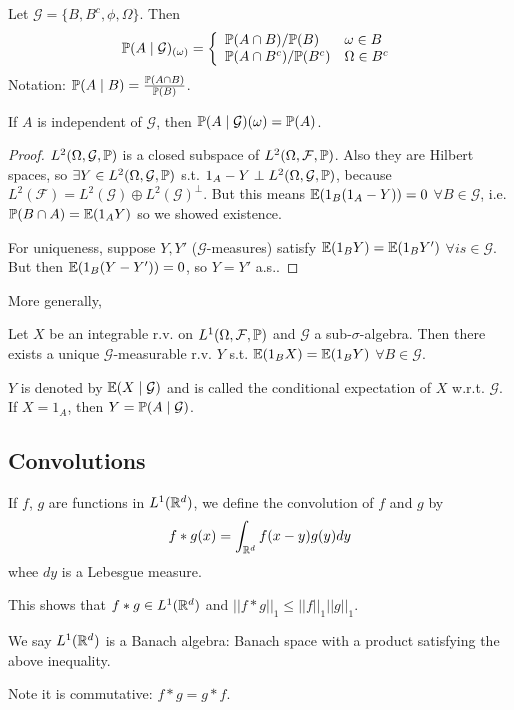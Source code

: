 \documentclass[a4paper]{article}
\begin{document}
\begin{eg}
Let $\mathcal{G} = \{B,B^c,\phi,\Omega\}$. Then
\begin{equation*}
\begin{aligned}
\P(A \mid \mathcal{G})_{(\omega)} = \left\{
\begin{array}{ll}
\P(A \cap B) / \P(B) & \omega \in B\\
\P(A \cap B^c) / \P(B^c) & \Omega \in B^c
\end{array}
\right.
\end{aligned}
\end{equation*}
Notation: $\P(A \mid B) = \frac{\P(A \cap B)}{\P(B)}$.

If $A$ is independent of $\mathcal{G}$, then $\P(A \mid \mathcal{G})(\omega) = \P(A)$.
\begin{proof}
$L^2(\Omega,\mathcal{G},\P)$ is a closed subspace of $L^2(\Omega,\mathcal{F},\P)$. Also they are Hilbert spaces, so $\exists Y \in L^2 (\Omega,\mathcal{G},\P)$ s.t. $1_A - Y \perp L^2 (\Omega,\mathcal{G},\P)$, because $L^2(\mathcal{F}) = L^2 (\mathcal{G}) \oplus L^2(\mathcal{G})^\perp$. But this means $\E(1_B (1_A-Y)) = 0$ $\forall B \in \mathcal{G}$, i.e. $\P(B \cap A) = \E(1_A Y)$ so we showed existence.

For uniqueness, suppose $Y,Y'$ ($\mathcal{G}$-measures) satisfy $\E (1_B Y) = \E(1_B Y')$ $\forall is \in \mathcal{G}$. But then $\E(1_B(Y-Y')) = 0$, so $Y=Y'$ a.s..
\end{proof}
\end{eg}

More generally,
\begin{prop}
Let $X$ be an integrable r.v. on $L^1(\Omega,\mathcal{F},\P)$ and $\mathcal{G}$ a sub-$\sigma$-algebra. Then there exists a unique $\mathcal{G}$-measurable r.v. $Y$ s.t. $\E(1_B X) = \E(1_B Y)$ $\forall B \in \mathcal{G}$.
\begin{rem}
$Y$ is denoted by $\E(X\mid\mathcal{G})$ and is called the conditional expectation of $X$ w.r.t. $\mathcal{G}$. If $X = 1_A$, then $Y = \P(A\mid\mathcal{G})$.
\end{rem}
\end{prop}

\subsection{Convolutions}
\begin{defi}
If $f$, $g$ are functions in $L^1(\R^d)$, we define the convolution of $f$ and $g$ by 
\begin{equation*}
\begin{aligned}
f*g(x) = \int_{\R^d} f(x-y) g(y) dy
\end{aligned}
\end{equation*}
whee $dy$ is a Lebesgue measure.
\begin{rem}
This shows that $f*g \in L^1(\R^d)$ and $||f*g||_1 \leq ||f||_1||g||_1$.

We say $L^1(\R^d)$ is a Banach algebra: Banach space with a product satisfying the above inequality.

Note it is commutative: $f*g = g*f$.
\end{rem}
\end{defi}
\end{document}
